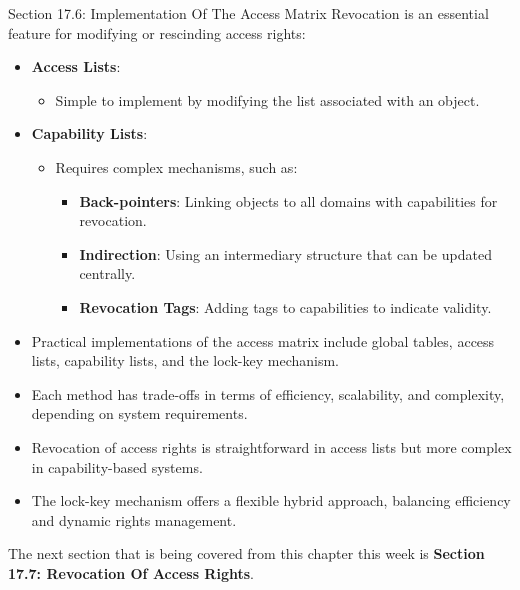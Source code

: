 \begin{notes}{Section 17.6: Implementation Of The Access Matrix}
    Revocation is an essential feature for modifying or rescinding access rights:
    \begin{itemize}
        \item \textbf{Access Lists}:
        \begin{itemize}
            \item Simple to implement by modifying the list associated with an object.
        \end{itemize}
        \item \textbf{Capability Lists}:
        \begin{itemize}
            \item Requires complex mechanisms, such as:
            \begin{itemize}
                \item \textbf{Back-pointers}: Linking objects to all domains with capabilities for revocation.
                \item \textbf{Indirection}: Using an intermediary structure that can be updated centrally.
                \item \textbf{Revocation Tags}: Adding tags to capabilities to indicate validity.
            \end{itemize}
        \end{itemize}
    \end{itemize}
    
    \begin{highlight}
        \begin{itemize}
            \item Practical implementations of the access matrix include global tables, access lists, capability lists, and the lock-key mechanism.
            \item Each method has trade-offs in terms of efficiency, scalability, and complexity, depending on system requirements.
            \item Revocation of access rights is straightforward in access lists but more complex in capability-based systems.
            \item The lock-key mechanism offers a flexible hybrid approach, balancing efficiency and dynamic rights management.
        \end{itemize}
    \end{highlight}
\end{notes}

The next section that is being covered from this chapter this week is \textbf{Section 17.7: Revocation Of Access Rights}.

